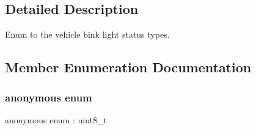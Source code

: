\subsection{Detailed Description}
Enum to the vehicle bink light status types. 

\subsection{Member Enumeration Documentation}
\mbox{\label{structmaf__perception__interface_1_1VehicleBlinkLightEnum_a615f1a0dac3be524a103189f2cc44fff}} 
\subsubsection{\texorpdfstring{anonymous enum}{anonymous enum}}
{\footnotesize\ttfamily anonymous enum \+: uint8\+\_\+t}

